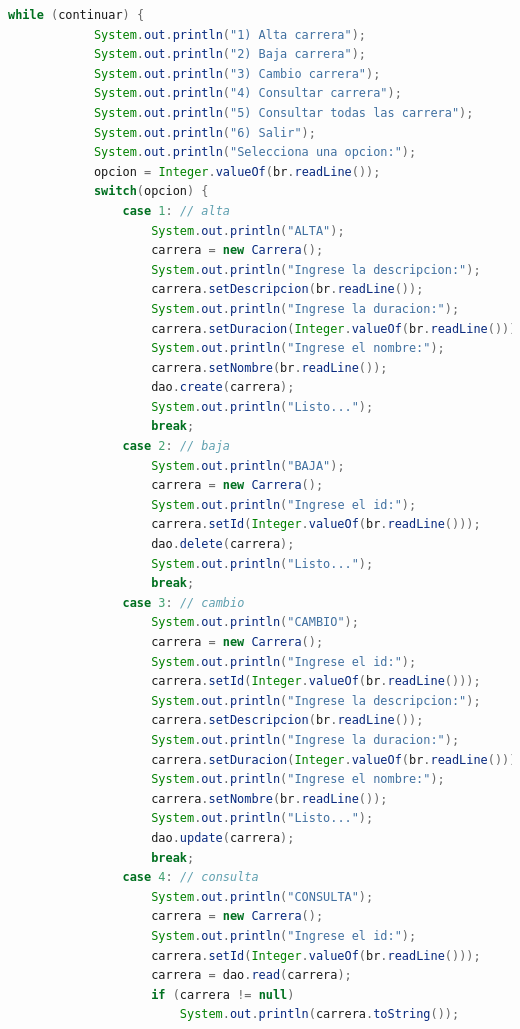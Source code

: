 \documentclass[a4paper,12pt]{article}
\begin{document}
\begin{lstlisting}[language=Java, style=customJava, 
caption={Instituto.java},captionpos=b,basicstyle=\fontfamily{cmss}\small]
        while (continuar) {
            System.out.println("1) Alta carrera");
            System.out.println("2) Baja carrera");
            System.out.println("3) Cambio carrera");
            System.out.println("4) Consultar carrera");
            System.out.println("5) Consultar todas las carrera");
            System.out.println("6) Salir");
            System.out.println("Selecciona una opcion:");
            opcion = Integer.valueOf(br.readLine());
            switch(opcion) {
                case 1: // alta
                    System.out.println("ALTA");
                    carrera = new Carrera();
                    System.out.println("Ingrese la descripcion:");
                    carrera.setDescripcion(br.readLine());
                    System.out.println("Ingrese la duracion:");
                    carrera.setDuracion(Integer.valueOf(br.readLine()));
                    System.out.println("Ingrese el nombre:");
                    carrera.setNombre(br.readLine());
                    dao.create(carrera);
                    System.out.println("Listo...");
                    break;
                case 2: // baja
                    System.out.println("BAJA");
                    carrera = new Carrera();
                    System.out.println("Ingrese el id:");
                    carrera.setId(Integer.valueOf(br.readLine()));
                    dao.delete(carrera);
                    System.out.println("Listo...");
                    break;
                case 3: // cambio
                    System.out.println("CAMBIO");
                    carrera = new Carrera();
                    System.out.println("Ingrese el id:");
                    carrera.setId(Integer.valueOf(br.readLine()));
                    System.out.println("Ingrese la descripcion:");
                    carrera.setDescripcion(br.readLine());
                    System.out.println("Ingrese la duracion:");
                    carrera.setDuracion(Integer.valueOf(br.readLine()));
                    System.out.println("Ingrese el nombre:");
                    carrera.setNombre(br.readLine());
                    System.out.println("Listo...");
                    dao.update(carrera);
                    break;
                case 4: // consulta
                    System.out.println("CONSULTA");
                    carrera = new Carrera();
                    System.out.println("Ingrese el id:");
                    carrera.setId(Integer.valueOf(br.readLine()));
                    carrera = dao.read(carrera);
                    if (carrera != null)
                        System.out.println(carrera.toString());

\end{lstlisting}
\end{document}
